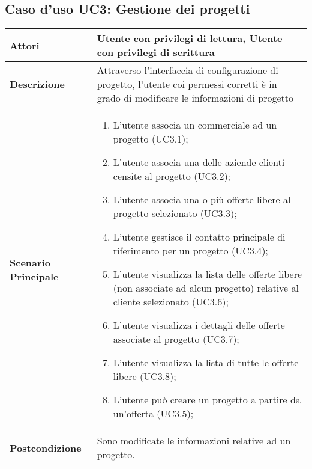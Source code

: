 	\subsection{Caso d'uso UC3: Gestione dei progetti}
	\begin{longtable}{ | p{2.7cm} | p{12cm} |}
		\hline \textbf{Attori} & Utente con privilegi di lettura, Utente con privilegi di scrittura\\ 
		\hline \textbf{Descrizione} & Attraverso l’interfaccia di configurazione di progetto, l’utente coi permessi corretti è in grado di modificare le informazioni di progetto \\ 
		\hline \textbf{Scenario Principale} & \begin{enumerate}
			\item L’utente associa un commerciale ad un progetto  (UC3.1);
			\item L’utente associa una delle aziende clienti censite al progetto  (UC3.2);
			\item L’utente associa una o più offerte libere al progetto selezionato  (UC3.3);
			\item L’utente gestisce il contatto principale di riferimento per un progetto  (UC3.4);
			\item L’utente visualizza la lista delle offerte libere (non associate ad alcun progetto) relative al cliente selezionato  (UC3.6);
			\item L’utente visualizza i dettagli delle offerte associate al progetto  (UC3.7);
			\item L’utente visualizza la lista di tutte le offerte libere  (UC3.8);
			\item L’utente può creare un progetto a partire da un’offerta  (UC3.5);
			
		\end{enumerate}
		\\ 
		\hline \textbf{Postcondizione} & Sono modificate le informazioni relative ad un progetto. \\ 
		\hline 
	\end{longtable}
	
	\hypertarget{UC3.4}{}
